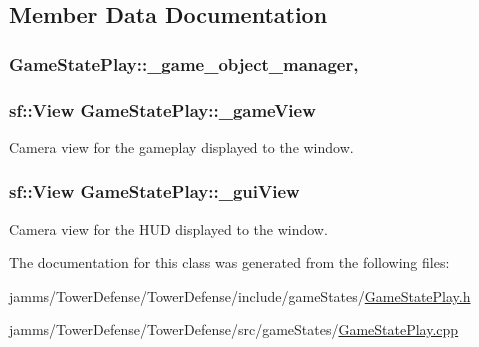 \subsection{Member Data Documentation}
\hypertarget{class_game_state_play_a3f05ff560a8dbeb5a1922e23c6bbff72}{
\subsubsection[{\+\_\+game\+\_\+object\+\_\+manager}]{ Game\+State\+Play\+::\+\_\+game\+\_\+object\+\_\+manager\hspace{0.3cm}{\ttfamily [static]}, {\ttfamily [private]}}}\label{class_game_state_play_a3f05ff560a8dbeb5a1922e23c6bbff72}
\hypertarget{class_game_state_play_a9513cfeac2178d83e23ba6f9291fba8c}{
\subsubsection[{\+\_\+game\+View}]{\setlength{\rightskip}{0pt plus 5cm}sf\+::\+View Game\+State\+Play\+::\+\_\+game\+View\hspace{0.3cm}{\ttfamily [private]}}}\label{class_game_state_play_a9513cfeac2178d83e23ba6f9291fba8c}


Camera view for the gameplay displayed to the window. 

\hypertarget{class_game_state_play_affee804e287fd1968fe8c5b0a303b05d}{
\subsubsection[{\+\_\+gui\+View}]{\setlength{\rightskip}{0pt plus 5cm}sf\+::\+View Game\+State\+Play\+::\+\_\+gui\+View\hspace{0.3cm}{\ttfamily [private]}}}\label{class_game_state_play_affee804e287fd1968fe8c5b0a303b05d}


Camera view for the H\+U\+D displayed to the window. 



The documentation for this class was generated from the following files\+:\begin{DoxyCompactItemize}
\item 
jamms/\+Tower\+Defense/\+Tower\+Defense/include/game\+States/\hyperlink{_game_state_play_8h}{Game\+State\+Play.\+h}\item 
jamms/\+Tower\+Defense/\+Tower\+Defense/src/game\+States/\hyperlink{_game_state_play_8cpp}{Game\+State\+Play.\+cpp}\end{DoxyCompactItemize}
